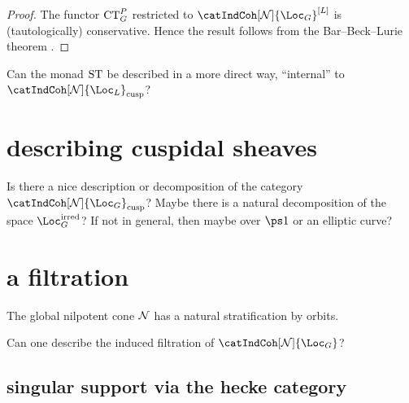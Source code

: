 \documentclass[english]{short-notes}
\begin{document}
\begin{proof}
    The functor $\CT P[G]$ restricted to $\catIndCoh[\globNilp]{\Loc_G}^{[L]}$ is (tautologically) conservative.
    Hence the result follows from the Bar--Beck--Lurie theorem \cite[Theorem~6.2.0.6]{Lurie:2012-draft:HigherAlgebra}.
\end{proof}

\begin{Q}
    Can the monad $\operatorname{ST}$ be described in a more direct way, \enquote{internal} to $\catIndCoh[\globNilp]{\Loc_L}_\cusp$?
\end{Q}

\section{describing cuspidal sheaves}

\begin{Q}
    Is there a nice description or decomposition of the category $\catIndCoh[\globNilp]{\Loc_G}_{\cusp}$?
    Maybe there is a natural decomposition of the space $\Loc_G^\irred$?
    If not in general, then maybe over $\ps 1$ or an elliptic curve?
\end{Q}

\section{a filtration}

The global nilpotent cone $\mathcal{N}$ has a natural stratification by orbits.

\begin{Q}
    Can one describe the induced filtration of $\catIndCoh[\globNilp]{\Loc_G}$?
\end{Q}

\subsection[Singular support via the Hecke category]{singular support via the hecke category}
\end{document}
